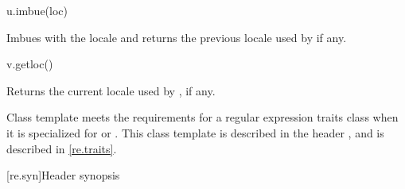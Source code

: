 \begin{itemdecl}
u.imbue(loc)
\end{itemdecl}

\begin{itemdescr}
\pnum
\result
{}

%
\pnum
\effects
Imbues  with the locale  and
returns the previous locale used by  if any.
\end{itemdescr}

\begin{itemdecl}
v.getloc()
\end{itemdecl}

\begin{itemdescr}
\pnum
\result
{}

\pnum
\returns
Returns the current locale used by , if any. %
\end{itemdescr}

\pnum
\begin{note}
Class template  meets the requirements for a
regular expression traits class when it is specialized for
 or .  This class template is described in
the header , and is described in \ref{re.traits}.
\end{note}

[re.syn]{Header  synopsis}

